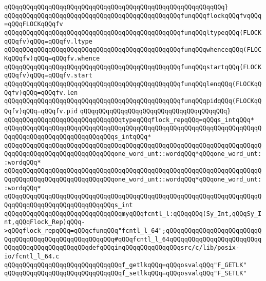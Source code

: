 \verb|qQQqqQQqqQQqqQQqqQQqqQQqqQQqqQQqqQQqqQQqqQQqqQQqqQQqqQQqqQQq}|\newline
\newline
\verb|qQQqqQQqqQQqqQQqqQQqqQQqqQQqqQQqqQQqqQQqqQQqqQQqfunqQQqflockqQQqfvqQQq=qQQqFLOCKqQQqfv|\newline
\verb|qQQqqQQqqQQqqQQqqQQqqQQqqQQqqQQqqQQqqQQqqQQqqQQqfunqQQqltypeqQQq(FLOCKqQQqfv)qQQq=qQQqfv.ltype|\newline
\verb|qQQqqQQqqQQqqQQqqQQqqQQqqQQqqQQqqQQqqQQqqQQqqQQqfunqQQqwhenceqQQq(FLOCKqQQqfv)qQQq=qQQqfv.whence|\newline
\verb|qQQqqQQqqQQqqQQqqQQqqQQqqQQqqQQqqQQqqQQqqQQqqQQqfunqQQqstartqQQq(FLOCKqQQqfv)qQQq=qQQqfv.start|\newline
\verb|qQQqqQQqqQQqqQQqqQQqqQQqqQQqqQQqqQQqqQQqqQQqqQQqfunqQQqlenqQQq(FLOCKqQQqfv)qQQq=qQQqfv.len|\newline
\verb|qQQqqQQqqQQqqQQqqQQqqQQqqQQqqQQqqQQqqQQqqQQqqQQqfunqQQqpidqQQq(FLOCKqQQqfv)qQQq=qQQqfv.pid|\newline
\verb|qQQqqQQqqQQqqQQqqQQqqQQqqQQqqQQqqQQqqQQq}|\newline
\newline
\verb|qQQqqQQqqQQqqQQqqQQqqQQqqQQqqQQqtypeqQQqflock_repqQQq=qQQqs_intqQQq*|\newline
\verb|qQQqqQQqqQQqqQQqqQQqqQQqqQQqqQQqqQQqqQQqqQQqqQQqqQQqqQQqqQQqqQQqqQQqqQQqqQQqqQQqqQQqqQQqqQQqqQQqqQQqs_intqQQq*|\newline
\verb|qQQqqQQqqQQqqQQqqQQqqQQqqQQqqQQqqQQqqQQqqQQqqQQqqQQqqQQqqQQqqQQqqQQqqQQqqQQqqQQqqQQqqQQqqQQqqQQqqQQqone_word_unt::wordqQQq*qQQqone_word_unt::wordqQQq*|\newline
\verb|qQQqqQQqqQQqqQQqqQQqqQQqqQQqqQQqqQQqqQQqqQQqqQQqqQQqqQQqqQQqqQQqqQQqqQQqqQQqqQQqqQQqqQQqqQQqqQQqqQQqone_word_unt::wordqQQq*qQQqone_word_unt::wordqQQq*|\newline
\verb|qQQqqQQqqQQqqQQqqQQqqQQqqQQqqQQqqQQqqQQqqQQqqQQqqQQqqQQqqQQqqQQqqQQqqQQqqQQqqQQqqQQqqQQqqQQqqQQqqQQqs_int|\newline
\newline
\verb|qQQqqQQqqQQqqQQqqQQqqQQqqQQqqQQqmyqQQqfcntl_l:qQQqqQQq(Sy_Int,qQQqSy_Int,qQQqFlock_Rep)qQQq->qQQqflock_repqQQq=qQQqcfunqQQq"fcntl_l_64";qQQqqQQqqQQqqQQqqQQqqQQqqQQqqQQqqQQqqQQqqQQqqQQqqQQqqQQq#qQQqfcntl_l_64qQQqqQQqqQQqqQQqqQQqqQQqqQQqqQQqqQQqqQQqqQQqqQQqdefqQQqinqQQqqQQqqQQqqQQqsrc/c/lib/posix-io/fcntl_l_64.c|\newline
\verb|qQQqqQQqqQQqqQQqqQQqqQQqqQQqqQQqf_getlkqQQq=qQQqosvalqQQq"F_GETLK"|\newline
\verb|qQQqqQQqqQQqqQQqqQQqqQQqqQQqqQQqf_setlkqQQq=qQQqosvalqQQq"F_SETLK"|\newline
